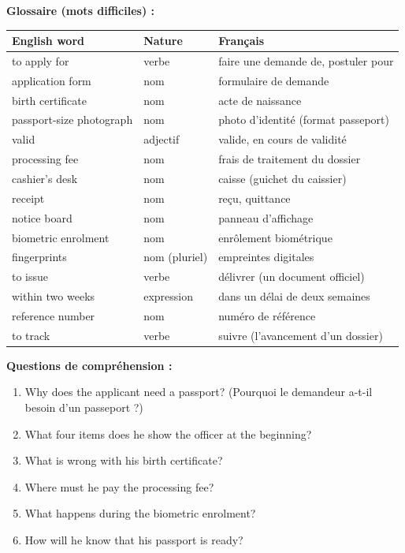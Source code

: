 \documentclass[11pt]{article}
\begin{document}
\textbf{Glossaire (mots difficiles) :}

\begin{center}
\begin{tabularx}{\linewidth}{|l|l|X|}
\hline
\rowcolor{popblueL} \textbf{English word} & \textbf{Nature} & \textbf{Français} \\
\hline
to apply for & verbe & faire une demande de, postuler pour \\
\hline
application form & nom & formulaire de demande \\
\hline
birth certificate & nom & acte de naissance \\
\hline
passport-size photograph & nom & photo d'identité (format passeport) \\
\hline
valid & adjectif & valide, en cours de validité \\
\hline
processing fee & nom & frais de traitement du dossier \\
\hline
cashier's desk & nom & caisse (guichet du caissier) \\
\hline
receipt & nom & reçu, quittance \\
\hline
notice board & nom & panneau d'affichage \\
\hline
biometric enrolment & nom & enrôlement biométrique \\
\hline
fingerprints & nom (pluriel) & empreintes digitales \\
\hline
to issue & verbe & délivrer (un document officiel) \\
\hline
within two weeks & expression & dans un délai de deux semaines \\
\hline
reference number & nom & numéro de référence \\
\hline
to track & verbe & suivre (l'avancement d'un dossier) \\
\hline
\end{tabularx}
\end{center}

\textbf{Questions de compréhension :}
\begin{enumerate}
\item Why does the applicant need a passport? (Pourquoi le demandeur a-t-il besoin d'un passeport ?)
\item What four items does he show the officer at the beginning?
\item What is wrong with his birth certificate?
\item Where must he pay the processing fee?
\item What happens during the biometric enrolment?
\item How will he know that his passport is ready?
\end{enumerate}
\end{document}
